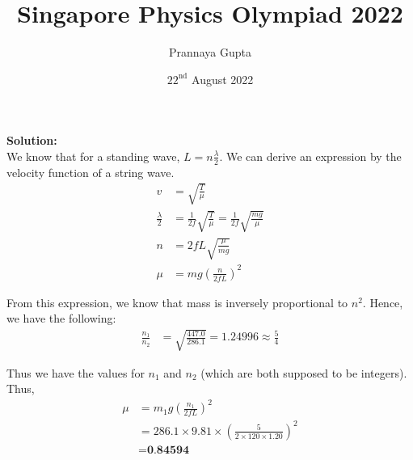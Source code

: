 \documentclass[a4paper, 12pt, addpoints]{exam}
\title{Singapore Physics Olympiad \textbf{2022}}
\author{Prannaya Gupta}
\date{$22^{\text{nd}}$ August 2022}
\begin{document}
\maketitle


\begin{tcolorbox}
\textbf{Solution:}\\
We know that for a standing wave, $L = n\frac{\lambda}{2}$. We can derive an expression by the velocity function of a string wave.
\begin{align*}
v &= \sqrt{\frac{T}{\mu}} \\
\frac{\lambda}2 &= \frac{1}{2f}\sqrt{\frac{T}{\mu}} = \frac{1}{2f} \sqrt{\frac{mg}{\mu}} \\
n &= 2fL \sqrt{\frac{\mu}{mg}} \\
\mu &= mg \left(\frac{n}{2fL} \right)^2
\end{align*}

From this expression, we know that mass is inversely proportional to $n^2$. Hence, we have the following:
\begin{align*}
\frac{n_1}{n_2} &= \sqrt{\frac{447.0}{286.1}} = 1.24996 \approx \frac{5}{4}
\end{align*}

Thus we have the values for $n_1$ and $n_2$ (which are both supposed to be integers). Thus,
\begin{align*}
\mu &= m_1 g \left(\frac{n_1}{2fL} \right)^2 \\
&= 286.1 \times 9.81 \times \left(\frac{5}{2\times 120 \times 1.20} \right)^2 \\
&= \textbf{0.84594} 
\end{align*}
\end{tcolorbox}
\end{document}
